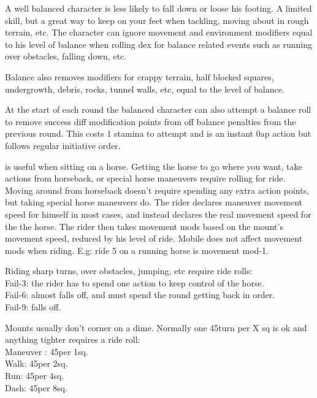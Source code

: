  A well balanced character is less likely to fall down or loose his footing. A limited skill, but a great way to keep on your feet when tackling, moving about in rough terrain, etc.
The character can ignore movement and environment modifiers equal to his level of balance when rolling dex for balance related events such as running over obstacles, falling down, etc.

Balance also removes modifiers for crappy terrain, half blocked squares, undergrowth, debris, rocks, tunnel walls, etc, equal to the level of balance.

At the start of each round the balanced character can also attempt a balance roll to remove success diff modification points from off balance penalties from the previous round. This costs 1 stamina to attempt and is an instant 0ap action but follows regular initiative order.


 is useful when sitting on a horse. Getting the horse to go where you want, take actions from horseback, or special horse maneuvers require rolling for ride. Moving around from horseback doesn't require spending any extra action points, but taking special horse maneuvers do. The rider declares maneuver movement speed for himself in most cases, and instead declares the real movement speed for the the horse. The rider then takes movement mods based on the mount's movement speed, reduced by his level of ride. Mobile does not affect movement mods when riding. E.g: ride 5 on a running horse is movement mod-1.

Riding sharp turns, over obstacles, jumping, etc require ride rolls:\\
Fail-3: the rider has to spend one action to keep control of the horse.\\
Fail-6: almost falls off, and must spend the round getting back in order.\\
Fail-9: falls off.

Mounts usually don't corner on a dime. Normally one 45\degrees turn per X sq is ok and anything tighter requires a ride roll:\\
Maneuver : 45\degrees per 1sq.\\
Walk: 45\degrees per 2sq.\\
Run: 45\degrees per 4sq.\\
Dash: 45\degrees per 8sq.


